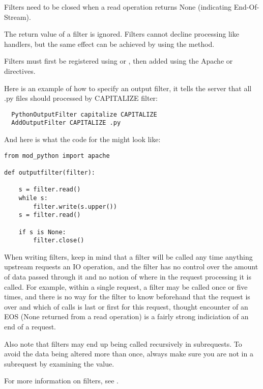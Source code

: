 Filters need to be closed when a read operation returns None 
(indicating End-Of-Stream).

The return value of a filter is ignored. Filters cannot decline
processing like handlers, but the same effect can be achieved
by using the  method.

Filters must first be registered using  or
, then added using the Apache
 or  directives. 

Here is an example of how to specify an output filter, it tells the
server that all .py files should processed by CAPITALIZE filter:

\begin{verbatim}
  PythonOutputFilter capitalize CAPITALIZE
  AddOutputFilter CAPITALIZE .py
\end{verbatim}

And here is what the code for the  might look
like:

\begin{verbatim}
from mod_python import apache
  
def outputfilter(filter):

    s = filter.read()
    while s:
        filter.write(s.upper())
	s = filter.read()

    if s is None:
        filter.close()

\end{verbatim}

When writing filters, keep in mind that a filter will be called any
time anything upstream requests an IO operation, and the filter has no
control over the amount of data passed through it and no notion of
where in the request processing it is called. For example, within a
single request, a filter may be called once or five times, and there
is no way for the filter to know beforehand that the request is over
and which of calls is last or first for this request, thought
encounter of an EOS (None returned from a read operation) is a fairly
strong indiciation of an end of a request.

Also note that filters may end up being called recursively in
subrequests. To avoid the data being altered more than once, always
make sure you are not in a subrequest by examining the 
value.

For more information on filters, see
.

